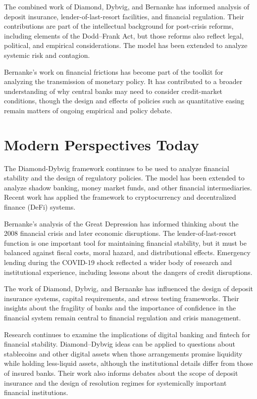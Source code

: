 The combined work of Diamond, Dybvig, and Bernanke has informed analysis of deposit insurance,
lender-of-last-resort facilities, and financial regulation. Their contributions are part of the
intellectual background for post-crisis reforms, including elements of the Dodd--Frank Act, but
those reforms also reflect legal, political, and empirical considerations. The model has been
extended to analyze systemic risk and contagion.

Bernanke's work on financial frictions has become part of the toolkit for analyzing the
transmission of monetary policy. It has contributed to a broader understanding of why central
banks may need to consider credit-market conditions, though the design and effects of policies
such as quantitative easing remain matters of ongoing empirical and policy debate.

\section{Modern Perspectives Today}
The Diamond-Dybvig framework continues to be used to analyze financial stability and the
design of regulatory policies. The model has been extended to analyze shadow banking,
money market funds, and other financial intermediaries. Recent work has applied the
framework to cryptocurrency and decentralized finance (DeFi) systems.

Bernanke's analysis of the Great Depression has informed thinking about the 2008 financial
crisis and later economic disruptions. The lender-of-last-resort function is one important tool
for maintaining financial stability, but it must be balanced against fiscal costs, moral hazard,
and distributional effects. Emergency lending during the COVID-19 shock reflected a wider body
of research and institutional experience, including lessons about the dangers of credit
disruptions.

The work of Diamond, Dybvig, and Bernanke has influenced the design of deposit insurance
systems, capital requirements, and stress testing frameworks. Their insights about the
fragility of banks and the importance of confidence in the financial system remain
central to financial regulation and crisis management.

Research continues to examine the implications of digital banking and fintech for financial
stability. Diamond--Dybvig ideas can be applied to questions about stablecoins and other digital
assets when those arrangements promise liquidity while holding less-liquid assets, although the
institutional details differ from those of insured banks. Their work also informs debates about
the scope of deposit insurance and the design of resolution regimes for systemically important
financial institutions.

